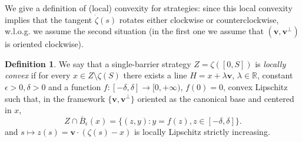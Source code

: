 \documentclass[reqno]{amsart}
\newcounter{assu}
\theoremstyle{definition} \newtheorem{definition}{Definition}[section]
\theoremstyle{definition} \newtheorem{remark}[definition]{Remark}
\theoremstyle{plain} \newtheorem{lemma}[definition]{Lemma}
\theoremstyle{plain} \newtheorem{proposition}[definition]{Proposition}
\theoremstyle{plain} \newtheorem{theorem}[definition]{Theorem}
\theoremstyle{plain} \newtheorem{corollary}[definition]{Corollary}
\theoremstyle{definition} \newtheorem{example}[definition]{Example}
\theoremstyle{plain} \newtheorem{claim}[clai]{Claim}
\theoremstyle{definition} \newtheorem{assumption}[definition]{Assumption}
\theoremstyle{definition} \newtheorem{observation}[definition]{Observation}
\newcommand{\R}{\mathbb{R}}
\newcommand{\1}{\mathbbm 1}
\numberwithin{equation}{section} %
\theoremstyle{plain} \newtheorem*{theorem*}{Theorem}
\theoremstyle{plain} \newtheorem{mthm}[maintheorem]{Main Theorem}
\theoremstyle{plain} \newtheorem*{mthm*}{Main Theorem}
\theoremstyle{plain} \newtheorem*{conjecture*}{Conjecture}
\theoremstyle{plain} \newtheorem{conjecture}[definition]{Conjecture}
\theoremstyle{plain} \newtheorem*{problem*}{Problem}
\begin{document}
We give a definition of (local) convexity for strategies: since this local convexity implies that the tangent $\dot \zeta(s)$ rotates either clockwise or counterclockwise, w.l.o.g. we assume the second situation (in the first one we assume that $(\mathbf v,\mathbf v^\perp)$ is oriented clockwise).

\begin{definition}
\label{def:convexity:spiral}
We say that a single-barrier strategy $Z=\zeta([0,S])$ is \emph{locally convex} if for every $x\in Z\setminus \zeta(S)$ there exists a line %
$H = x + \lambda \mathbf{v}$, $\lambda \in \R$, constant $\epsilon>0,\delta>0$ and a function $f:[-\delta,\delta]\rightarrow [0,+\infty)$, $f(0) = 0$, convex Lipschitz such that, in the framework $\lbrace \mathbf v,\mathbf v^\perp\rbrace$ %
oriented as the canonical base and centered in $x$, 
\begin{equation*}
Z \cap \overline{B}_\epsilon(x)= \big\lbrace (z,y): y= f(z), z\in[-\delta,\delta] \big\rbrace.
\end{equation*}
and $s \mapsto z(s) = \mathbf v \cdot (\zeta(s) - x)$ is locally Lipschitz strictly increasing.
\end{definition}
\end{document}
